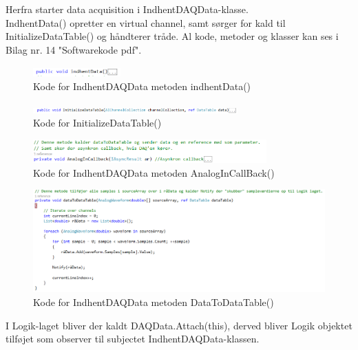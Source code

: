 Herfra starter data acquisition i IndhentDAQData-klasse.
\\ IndhentData() opretter en virtual channel, samt sørger for kald til InitializeDataTable() og håndterer tråde. Al kode, metoder og klasser kan ses i Bilag nr. 14 "Softwarekode pdf". 

\begin{figure}[H]
	\centering
	\includegraphics[width=0.3\textwidth]{FigurerProgram/indhentDataDaq}
	\caption{Kode for IndhentDAQData metoden indhentData() }
	\label{fig:IndhentDataDAQ}
\end{figure}

\begin{figure}[H]
	\centering
	\includegraphics[width=0.7\textwidth]{FigurerProgram/InitiDaq}
	\caption{Kode for InitializeDataTable()}
\end{figure}

\begin{figure}[H]
	\centering
	\includegraphics[width=0.8\textwidth]{FigurerProgram/CallBackDaq}
	\caption{Kode for IndhentDAQData metoden AnalogInCallBack()}
	\label{fig:CallBackDAQ}
\end{figure}

\begin{figure}[H]
	\centering
	\includegraphics[width=1.0\textwidth]{FigurerProgram/dtdDaq}
	\caption{Kode for IndhentDAQData metoden DataToDataTable()}
	\label{fig:dtdDAQ}
\end{figure}

I Logik-laget bliver der kaldt DAQData.Attach(this), derved bliver Logik objektet tilføjet som observer til subjectet IndhentDAQData-klassen.

